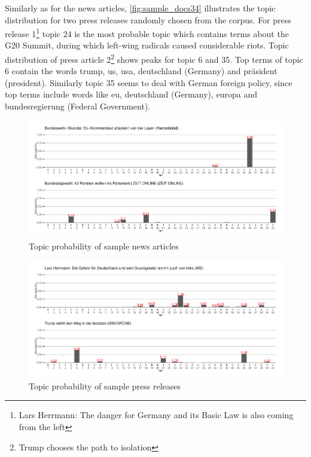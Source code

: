 \documentclass[
]{article}
\begin{document}
Similarly as for the news articles, \autoref{fig:sample_docs34}
illustrates the topic distribution for two press releases randomly
chosen from the corpus. For press release 1\footnote{Lars Herrmann: The
  danger for Germany and its Basic Law is also coming from the left}
topic 24 is the most probable topic which contains terms about the G20
Summit, during which left-wing radicals caused considerable riots. Topic
distribution of press article 2\footnote{Trump chooses the path to
  isolation} shows peaks for topic 6 and 35. Top terms of topic 6
contain the words trump, us, usa, deutschland (Germany) and präsident
(president). Similarly topic 35 seems to deal with German foreign
policy, since top terms include words like eu, deutschland (Germany),
europa and bundesregierung (Federal Government).

\begin{figure}

{\centering \includegraphics[width=0.8\linewidth]{main_text_files/figure-latex/News articles sample documents-1} 

}

\caption{Topic probability of sample news articles \label{fig:sample_docs12}}\label{fig:News articles sample documents}
\end{figure}

\begin{figure}

{\centering \includegraphics[width=0.8\linewidth]{main_text_files/figure-latex/Press releases sample documents-1} 

}

\caption{Topic probability of sample press releases \label{fig:sample_docs34}}\label{fig:Press releases sample documents}
\end{figure}
\end{document}
